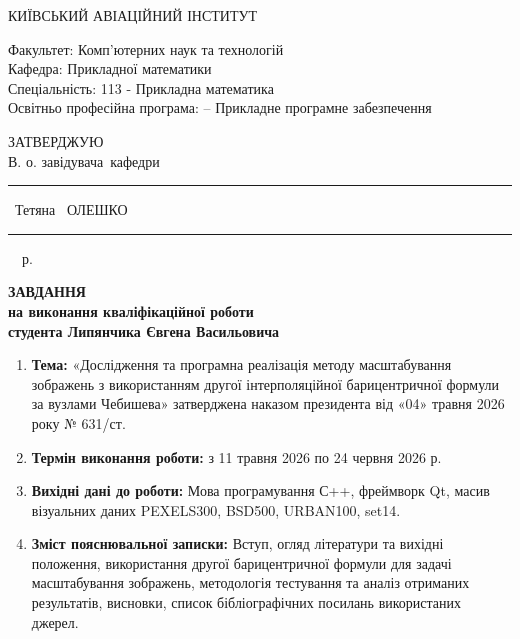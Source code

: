 
%
	\graphicspath{{images/}}
	
	{ \centering \large
		\MakeUppercase{київський авіаційний інститут}\\
	}
	\vspace{5mm}
	\begin{raggedright}
		Факультет: Комп'ютерних наук та технологій\\
		Кафедра: Прикладної математики\\
		Спеціальність: 113 - Прикладна математика\\
		Освітньо професійна програма: -- Прикладне програмне забезпечення\\
	\end{raggedright}
	\vspace{5mm}
	\begin{raggedleft}
		\MakeUppercase{затверджую}\\
		В. о. завідувача~кафедри\\
		\rule{2cm}{0.4pt}~Тетяна ~ОЛЕШКО\\
		\rule{5cm}{0.4pt}~\the\year{}~р.\\
	\end{raggedleft}
	
	\vfill
	
	{ \centering \large \bfseries
		\MakeUppercase{Завдання}\\
		на виконання кваліфікаційної роботи\\
		студента  Липянчика Євгена Васильовича\\
	}
	\begin{enumerate}
		\item \textbf{Тема:} «Дослідження та програмна реалізація методу масштабування зображень з використанням другої інтерполяційної барицентричної формули за вузлами Чебишева» затверджена наказом
		президента від «04» травня 2026 року № 631/ст.
		\item \textbf{Термін виконання роботи:} з 11 травня 2026 по 24 червня 2026 р.
		\item \textbf{Вихідні дані до роботи:} Мова програмування С++, фреймворк Qt, масив візуальних даних PEXELS300, BSD500, URBAN100, set14.
		\item \textbf{Зміст пояснювальної записки:} Вступ,  огляд літератури та вихідні положення,  використання другої барицентричної формули для задачі масштабування зображень,  методологія тестування та аналіз отриманих результатів, висновки, список бібліографічних посилань використаних джерел.  
	\end{enumerate}
	
